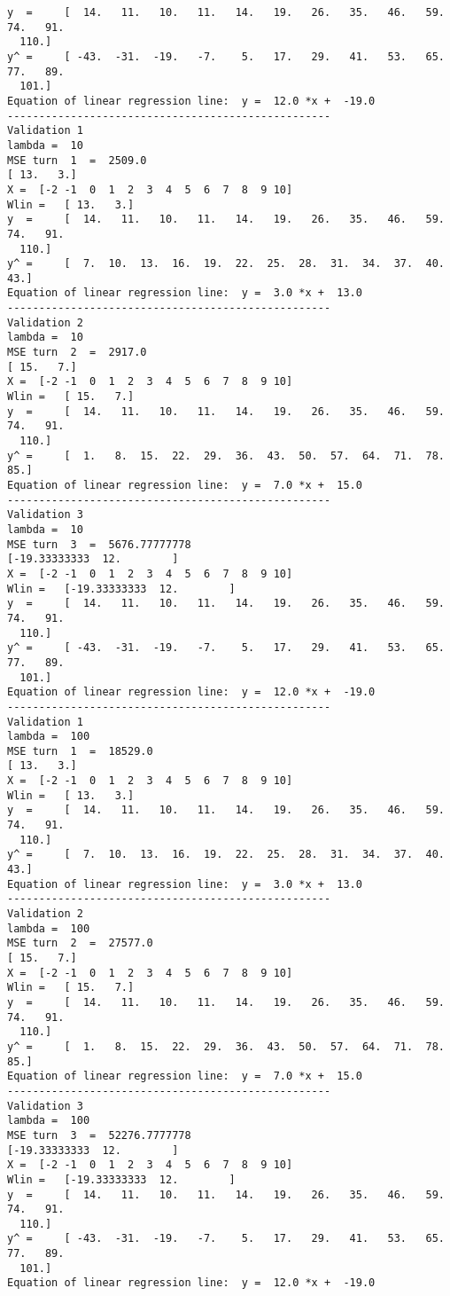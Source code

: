 \documentclass{article}
\begin{document}
\begin{lstlisting}[breaklines=true,basicstyle=\small]
y  =	 [  14.   11.   10.   11.   14.   19.   26.   35.   46.   59.   74.   91.
  110.]
y^ =	 [ -43.  -31.  -19.   -7.    5.   17.   29.   41.   53.   65.   77.   89.
  101.]
Equation of linear regression line:  y =  12.0 *x +  -19.0
---------------------------------------------------
Validation 1
lambda =  10
MSE turn  1  =  2509.0
[ 13.   3.]
X =	 [-2 -1  0  1  2  3  4  5  6  7  8  9 10]
Wlin =	 [ 13.   3.]
y  =	 [  14.   11.   10.   11.   14.   19.   26.   35.   46.   59.   74.   91.
  110.]
y^ =	 [  7.  10.  13.  16.  19.  22.  25.  28.  31.  34.  37.  40.  43.]
Equation of linear regression line:  y =  3.0 *x +  13.0
---------------------------------------------------
Validation 2
lambda =  10
MSE turn  2  =  2917.0
[ 15.   7.]
X =	 [-2 -1  0  1  2  3  4  5  6  7  8  9 10]
Wlin =	 [ 15.   7.]
y  =	 [  14.   11.   10.   11.   14.   19.   26.   35.   46.   59.   74.   91.
  110.]
y^ =	 [  1.   8.  15.  22.  29.  36.  43.  50.  57.  64.  71.  78.  85.]
Equation of linear regression line:  y =  7.0 *x +  15.0
---------------------------------------------------
Validation 3
lambda =  10
MSE turn  3  =  5676.77777778
[-19.33333333  12.        ]
X =	 [-2 -1  0  1  2  3  4  5  6  7  8  9 10]
Wlin =	 [-19.33333333  12.        ]
y  =	 [  14.   11.   10.   11.   14.   19.   26.   35.   46.   59.   74.   91.
  110.]
y^ =	 [ -43.  -31.  -19.   -7.    5.   17.   29.   41.   53.   65.   77.   89.
  101.]
Equation of linear regression line:  y =  12.0 *x +  -19.0
---------------------------------------------------
Validation 1
lambda =  100
MSE turn  1  =  18529.0
[ 13.   3.]
X =	 [-2 -1  0  1  2  3  4  5  6  7  8  9 10]
Wlin =	 [ 13.   3.]
y  =	 [  14.   11.   10.   11.   14.   19.   26.   35.   46.   59.   74.   91.
  110.]
y^ =	 [  7.  10.  13.  16.  19.  22.  25.  28.  31.  34.  37.  40.  43.]
Equation of linear regression line:  y =  3.0 *x +  13.0
---------------------------------------------------
Validation 2
lambda =  100
MSE turn  2  =  27577.0
[ 15.   7.]
X =	 [-2 -1  0  1  2  3  4  5  6  7  8  9 10]
Wlin =	 [ 15.   7.]
y  =	 [  14.   11.   10.   11.   14.   19.   26.   35.   46.   59.   74.   91.
  110.]
y^ =	 [  1.   8.  15.  22.  29.  36.  43.  50.  57.  64.  71.  78.  85.]
Equation of linear regression line:  y =  7.0 *x +  15.0
---------------------------------------------------
Validation 3
lambda =  100
MSE turn  3  =  52276.7777778
[-19.33333333  12.        ]
X =	 [-2 -1  0  1  2  3  4  5  6  7  8  9 10]
Wlin =	 [-19.33333333  12.        ]
y  =	 [  14.   11.   10.   11.   14.   19.   26.   35.   46.   59.   74.   91.
  110.]
y^ =	 [ -43.  -31.  -19.   -7.    5.   17.   29.   41.   53.   65.   77.   89.
  101.]
Equation of linear regression line:  y =  12.0 *x +  -19.0
\end{lstlisting}



\newpage


\end{document}
